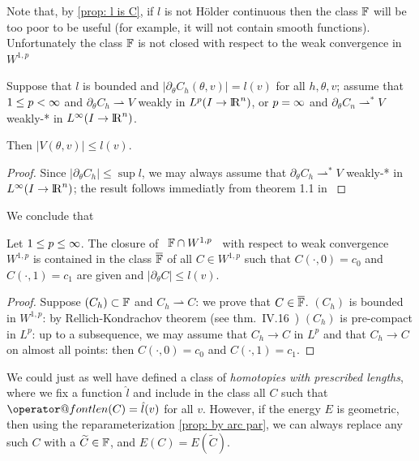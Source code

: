 \documentclass[twoside,a4paper,english]{article}
\makeatletter
\def\derpar#1{\partial_{#1}}
\def\wto{\rightharpoonup}
\def\len{\mathop{\operator@font len}\nolimits}
\makeatother
\begin{document}
Note that, by \ref{prop: l is C}, if  $l$ is not H\"older continuous
then the class ${\mathbb F}$ will be too poor to be useful (for example,
it will not contain  smooth functions).
Unfortunately the class ${\mathbb F}$ is not closed with respect to the weak convergence
in $W^{1,p}$
\begin{Proposition}\label{prop: le l}
  Suppose that $l$ is bounded and 
  $|\derpar \theta C_h(\theta,v)| =l(v) $ for all $h,\theta,v$;
  assume that $1\le p<\infty$ and 
  $\derpar \theta C_h \wto V$ weakly in $L^p(I\to{\protect\mathrm{l\hskip-0.15em R}}^n)$, or
  $p=\infty$ and   $\derpar \theta C_n \wto^* V$ weakly-* in
  $L^\infty(I\to{\protect\mathrm{l\hskip-0.15em R}}^n)$.

  Then   $|V(\theta,v)| \le l(v)$.
  \begin{proof}
    Since $|\derpar \theta C_h|\le \sup l$, we may always assume that
    $\derpar \theta C_h \wto^* V$ weakly-* in
    $L^\infty(I\to{\protect\mathrm{l\hskip-0.15em R}}^n)$; the result follows immediatly from
    theorem 1.1 in \cite{dacorogna:weak}
  \end{proof}
\end{Proposition}
We conclude that
\begin{Theorem}
  Let $1\le p \le \infty$.
  The closure of \, ${\mathbb F}\cap W^{1,p}$ \, with respect to weak convergence $W^{1,p}$
  is contained in
  the class $\overline {{\mathbb F}}$ of all $C\in W^{1,p}$ such that $C(\cdot,
  0)=c_0$ and $C(\cdot, 1)=c_1$ are given and $|\derpar \theta C| \le
  l(v) $. 
  \begin{proof}   
    Suppose $(C_h)\subset{\mathbb F}$ and $C_h\wto C$: we prove that $C\in\overline {{\mathbb F}}$.
    $(C_h)$ is bounded in $W^{1,p}$: by
    Rellich-Kondrachov theorem (see thm.\ IV.16\ \cite{Brezis})
    $(C_h)$ is pre-compact in $L^p$: up to a subsequence, we may
    assume that $C_h\to C$ in  $L^p$ and that $C_h\to C$
    on almost all points: then $C(\cdot,0)=c_0$ and $C(\cdot,1)=c_1$.
  \end{proof}
\end{Theorem}


\medskip 
\begin{Remark}
  
  We could just as well have defined a class of 
  \emph{homotopies with prescribed lengths}, where we fix
  a function $\hat l$ and include in the class all $C$ such that 
  $\len(C) =  \hat l(v)$ for all $v$. However, if the energy $E$ is geometric,
  then using the reparameterization \ref{prop: by arc par}, we can always
  replace any such $C$ with a $\widetilde C\in {\mathbb F}$, and
  $E(C)=E(\widetilde C)$. 
\end{Remark}
\end{document}
